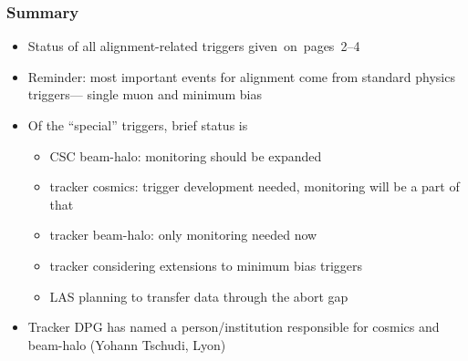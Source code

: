 \documentclass[compress]{beamer}
\begin{document}

\begin{frame}
\frametitle{Summary}

\begin{itemize}\setlength{\itemsep}{0.5 cm}
\item Status of all alignment-related triggers \mbox{given on pages~2--4\hspace{-1 cm}}
\item Reminder: most important events for alignment come from standard physics triggers--- single muon and minimum bias
\item Of the ``special'' triggers, brief status is
\begin{itemize}
\item CSC beam-halo: monitoring should be expanded
\item tracker cosmics: trigger development needed, monitoring will be a part of that
\item tracker beam-halo: only monitoring needed now
\item tracker considering extensions to minimum bias triggers
\item LAS planning to transfer data through the abort gap
\end{itemize}
\item Tracker DPG has named a person/institution responsible for cosmics and beam-halo (Yohann Tschudi, Lyon)
\end{itemize}

\label{numpages}
\end{frame}
\end{document}

